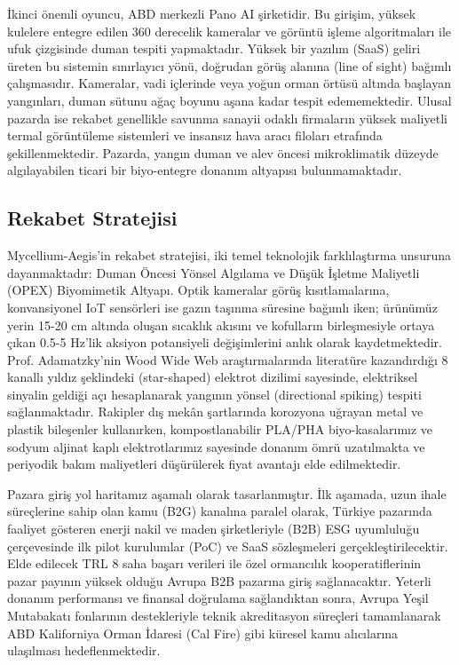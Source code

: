 \documentclass[11pt,a4paper]{article}
\begin{document}
İkinci önemli oyuncu, ABD merkezli Pano AI şirketidir. Bu girişim, yüksek kulelere entegre edilen 360 derecelik kameralar ve görüntü işleme algoritmaları ile ufuk çizgisinde duman tespiti yapmaktadır. Yüksek bir yazılım (SaaS) geliri üreten bu sistemin sınırlayıcı yönü, doğrudan görüş alanına (line of sight) bağımlı çalışmasıdır. Kameralar, vadi içlerinde veya yoğun orman örtüsü altında başlayan yangınları, duman sütunu ağaç boyunu aşana kadar tespit edememektedir. Ulusal pazarda ise rekabet genellikle savunma sanayii odaklı firmaların yüksek maliyetli termal görüntüleme sistemleri ve insansız hava aracı filoları etrafında şekillenmektedir. Pazarda, yangın duman ve alev öncesi mikroklimatik düzeyde algılayabilen ticari bir biyo-entegre donanım altyapısı bulunmamaktadır.

\subsection{Rekabet Stratejisi}

Mycellium-Aegis'in rekabet stratejisi, iki temel teknolojik farklılaştırma unsuruna dayanmaktadır: Duman Öncesi Yönsel Algılama ve Düşük İşletme Maliyetli (OPEX) Biyomimetik Altyapı. Optik kameralar görüş kısıtlamalarına, konvansiyonel IoT sensörleri ise gazın taşınma süresine bağımlı iken; ürünümüz yerin 15-20 cm altında oluşan sıcaklık akısını ve kofulların birleşmesiyle ortaya çıkan 0.5-5 Hz'lik aksiyon potansiyeli değişimlerini anlık olarak kaydetmektedir. Prof. Adamatzky'nin Wood Wide Web araştırmalarında literatüre kazandırdığı 8 kanallı yıldız şeklindeki (star-shaped) elektrot dizilimi sayesinde, elektriksel sinyalin geldiği açı hesaplanarak yangının yönsel (directional spiking) tespiti sağlanmaktadır. Rakipler dış mekân şartlarında korozyona uğrayan metal ve plastik bileşenler kullanırken, kompostlanabilir PLA/PHA biyo-kasalarımız ve sodyum aljinat kaplı elektrotlarımız sayesinde donanım ömrü uzatılmakta ve periyodik bakım maliyetleri düşürülerek fiyat avantajı elde edilmektedir.

Pazara giriş yol haritamız aşamalı olarak tasarlanmıştır. İlk aşamada, uzun ihale süreçlerine sahip olan kamu (B2G) kanalına paralel olarak, Türkiye pazarında faaliyet gösteren enerji nakil ve maden şirketleriyle (B2B) ESG uyumluluğu çerçevesinde ilk pilot kurulumlar (PoC) ve SaaS sözleşmeleri gerçekleştirilecektir. Elde edilecek TRL 8 saha başarı verileri ile özel ormancılık kooperatiflerinin pazar payının yüksek olduğu Avrupa B2B pazarına giriş sağlanacaktır. Yeterli donanım performansı ve finansal doğrulama sağlandıktan sonra, Avrupa Yeşil Mutabakatı fonlarının destekleriyle teknik akreditasyon süreçleri tamamlanarak ABD Kaliforniya Orman İdaresi (Cal Fire) gibi küresel kamu alıcılarına ulaşılması hedeflenmektedir.
\end{document}
